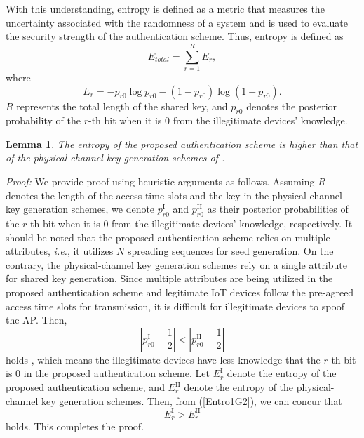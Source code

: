 \documentclass[journal,10pt]{IEEEtran}
\newtheorem{lemma}{Lemma}
\begin{document}
With this understanding, entropy is defined as a metric that measures the uncertainty associated with the randomness of a system \cite{wang2015survey} and is used to evaluate the security strength of the authentication scheme. Thus, entropy is defined as
\begin{equation} \label{entro1}
    E_{total} = \sum_{r=1}^R E_r,
\end{equation}
where
\begin{equation}\label{entro2}
    E_r = -p_{r0} \log p_{r0} - (1 - p_{r0}) \log (1-p_{r0}).
\end{equation}
$R$ represents the total length of the shared key, and $p_{r0}$ denotes the posterior probability of the $r$-th bit when it is $0$ from the illegitimate devices’ knowledge.

\begin{lemma}
\textit{The entropy of the proposed authentication scheme is higher than that of the physical-channel key generation schemes of \cite{wang2015survey, wilhelm2013secure, edman2016security, zhang2016efficient}.}
\end{lemma}

\textit{Proof:} We provide proof using heuristic arguments as follows. Assuming $R$ denotes the length of the access time slots and the key in the physical-channel key generation schemes, we denote $p_{r0}^{\text{I}}$ and $p_{r0}^{\text{II}}$ as their posterior probabilities of the $r$-th bit when it is $0$ from the illegitimate devices’ knowledge, respectively. It should be noted that the proposed authentication scheme relies on multiple attributes, \emph{i.e.}, it utilizes $N$ spreading sequences for seed generation. On the contrary, the physical-channel key generation schemes rely on a single attribute for shared key generation. Since multiple attributes are being utilized in the proposed authentication scheme and legitimate IoT devices follow the pre-agreed access time slots for transmission, it is difficult for illegitimate devices to spoof the AP. Then, 
\begin{equation} \label{Entro1G2}
    \left| p_{r0}^{\text{I}} - \frac{1}{2}    \right|   <    \left|p_{r0}^{\text{II}}  - \frac{1}{2}    \right|
\end{equation}
holds \cite{9378574}, which means the illegitimate devices have less knowledge that the $r$-th bit is $0$ in the proposed authentication scheme. Let $E_r^{\text{I}}$ denote the entropy of the proposed authentication scheme, and $E_r^{\text{II}}$ denote the entropy of the physical-channel key generation schemes. Then, from (\ref{Entro1G2}), we can concur that
\begin{equation}\label{entroI}
    E_r^{\text{I}} > E_r^{\text{II}}
\end{equation}
holds. This completes the proof. 
\end{document}
